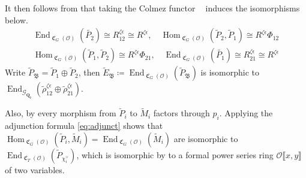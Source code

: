 \documentclass[leqno]{amsart}
\theoremstyle{definition}
\theoremstyle{remark}
\newcommand{\oo}{\mathcal{O}}
\newcommand{\Qp}{\mathbf{Q}_p}
\DeclareMathOperator{\End}{End}
\DeclareMathOperator{\Hom}{Hom}
\DeclareMathOperator{\fC}{\mathfrak{C}} %
\DeclareMathOperator{\V}{\check{\mathbf{V}}} %
\newcommand{\Gp}{\mathcal{G}_{\Qp}} %
\newcommand{\B}{\mathfrak B} %
\begin{document}
It then follows from \cite[Lem 8.10]{pask} that 
taking the Colmez functor 
$\V$ induces the isomorphisms below.
\begin{equation}\label{eq:end_deform}
\begin{split}
	\End_{\fC_{G}(\oo)}(\tilde{P_2})\cong 
    R^{\zeta\epsilon}_{12}\cong R^{\zeta\epsilon},\quad
	\Hom_{\fC_G(\oo)}(\tilde{P}_2, \tilde{P}_1)\cong
    R^{\zeta\epsilon}\Phi_{12}\\
	\Hom_{\fC_G(\oo)}(\tilde{P}_1, \tilde{P}_2)\cong
    R^{\zeta\epsilon}\Phi_{21},\quad
	\End_{\fC_{G}(\oo)}(\tilde{P_1})\cong 
    R^{\zeta\epsilon}_{21}\cong R^{\zeta\epsilon}
\end{split}
\end{equation}
Write $ \tilde{P}_\B=\tilde{P}_1\oplus \tilde{P}_2$,
then $\tilde{E}_\B\coloneqq
\End_{\fC_G(\oo)}(\tilde{P}_\B)$
is isomorphic to 
$\End_{\Gp}(\tilde{\rho}^{\zeta\epsilon}_{12}\oplus
\tilde{\rho}^{\zeta\epsilon}_{21})$.

Also,  by \cite[Prop 7.1]{pask}
every morphism from $\tilde{P}_i$ to $\tilde{M}_i$
factors through $p_i$.
Applying the adjunction formula \eqref{eq:adjunct} shows that
$\Hom_{\fC_G(\oo)}(\tilde{P}_i, \tilde{M}_i)=
\End_{\fC_G(\oo)}(\tilde{M}_i)$
are isomorphic to 
$\End_{\fC_T(\oo)}(\tilde{P}_{\chi_i^\vee})$,
which is isomorphic by \cite[Prop 3.34]{pask} to
a formal power series ring
$ \oo\llbracket x,y\rrbracket$
of two variables.
\end{document}
